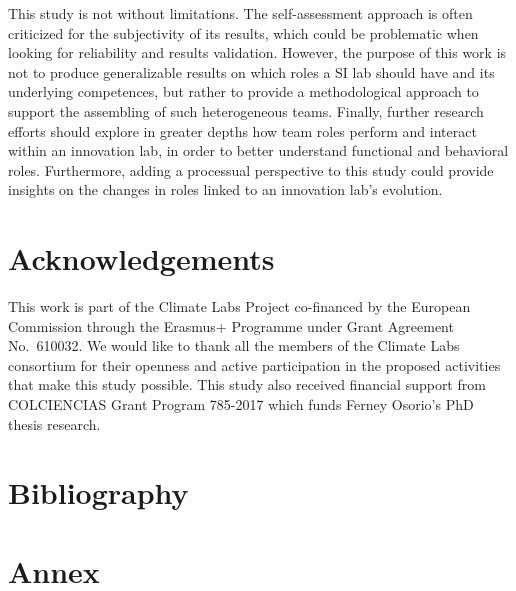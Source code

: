 \documentclass[AMA,STIX1COL,APA,STIX2COL]{WileyNJD-v2}
\begin{document}
This study is not without limitations. The self-assessment approach is
often criticized for the subjectivity of its results, which could be
problematic when looking for reliability and results validation.
However, the purpose of this work is not to produce generalizable
results on which roles a SI lab should have and its underlying
competences, but rather to provide a methodological approach to support
the assembling of such heterogeneous teams. Finally, further research
efforts should explore in greater depths how team roles perform and
interact within an innovation lab, in order to better understand
functional and behavioral roles. Furthermore, adding a processual
perspective to this study could provide insights on the changes in roles
linked to an innovation lab's evolution.

\hypertarget{acknowledgements}{%
\section{Acknowledgements}\label{acknowledgements}}

This work is part of the Climate Labs Project co-financed by the
European Commission through the Erasmus+ Programme under Grant Agreement
No.~610032. We would like to thank all the members of the Climate Labs
consortium for their openness and active participation in the proposed
activities that make this study possible. This study also received
financial support from COLCIENCIAS Grant Program 785-2017 which funds
Ferney Osorio's PhD thesis research.

\newpage

\hypertarget{bibliography}{%
\section{Bibliography}\label{bibliography}}

\hypertarget{annex}{%
\section*{Annex}\label{annex}}
\end{document}
